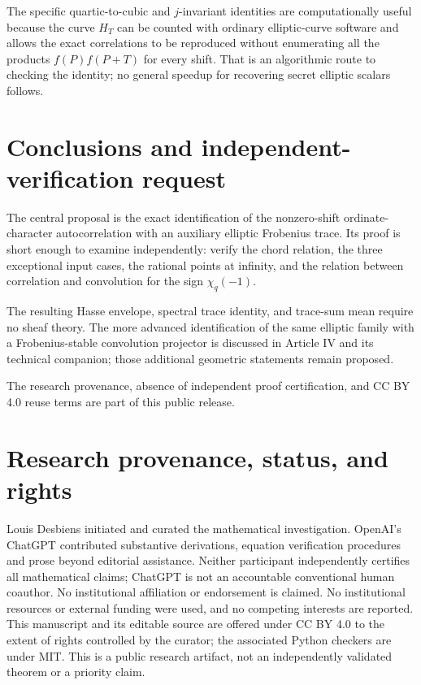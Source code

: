 \documentclass[11pt,a4paper]{article}
\numberwithin{equation}{section}
\begin{document}
The specific quartic-to-cubic and \(j\)-invariant identities are
computationally useful because the curve \(H_T\) can be counted
with ordinary elliptic-curve software and allows the exact
correlations to be reproduced without enumerating all the products
\(f(P)f(P+T)\) for every shift. That is an algorithmic route to
checking the identity; no general speedup for recovering secret
elliptic scalars follows.

\section{Conclusions and independent-verification request}
The central proposal is the exact identification of the nonzero-shift
ordinate-character autocorrelation with an auxiliary elliptic
Frobenius trace. Its proof is short enough to examine independently:
verify the chord relation, the three exceptional input cases, the
rational points at infinity, and the relation between correlation and
convolution for the sign \(\chi_q(-1)\).

The resulting Hasse envelope, spectral trace identity, and trace-sum
mean require no sheaf theory. The more advanced identification of the
same elliptic family with a Frobenius-stable convolution projector is
discussed in Article IV and its technical companion; those
additional geometric statements remain proposed.

The research provenance, absence of independent proof certification,
and CC BY 4.0 reuse terms are part of this public release.

\section*{Research provenance, status, and rights}

Louis Desbiens initiated and curated the mathematical investigation.
OpenAI's ChatGPT contributed substantive derivations, equation
verification procedures and prose beyond editorial assistance.
Neither participant independently certifies all mathematical claims;
ChatGPT is not an accountable conventional human coauthor.
No institutional affiliation or endorsement is claimed. No institutional
resources or external funding were used, and no competing interests are
reported. This manuscript and its editable source are offered under
CC BY 4.0 to the extent of rights controlled by the curator; the
associated Python checkers are under MIT. This is a public research
artifact, not an independently validated theorem or a priority claim.
\end{document}
